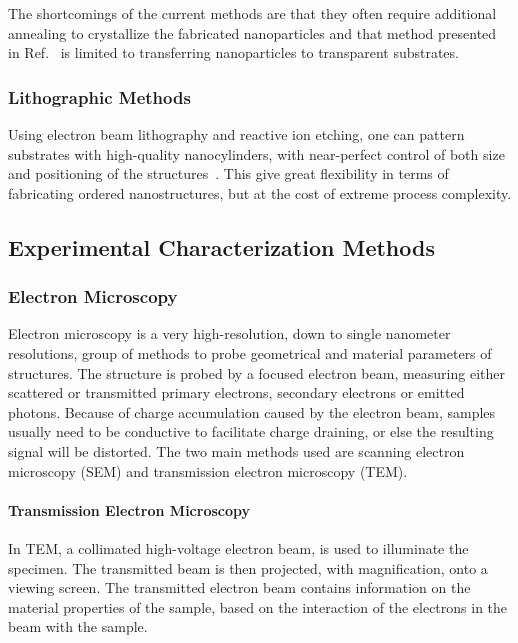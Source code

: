                 The shortcomings of the current methods are that they often require additional annealing to crystallize the fabricated nanoparticles and that
            method presented in Ref.~\cite{zywietz2014laser} is limited to transferring nanoparticles to transparent substrates.

        \subsubsection{Lithographic Methods}
                Using electron beam lithography and reactive ion etching, one can pattern substrates with high-quality nanocylinders, with near-perfect
            control of both size and positioning of the structures~\cite{bakker2015magnetic}. This give great flexibility in terms of fabricating ordered nanostructures, but at the
            cost of extreme process complexity.

    \subsection{Experimental Characterization Methods}
        \subsubsection{Electron Microscopy}
        \label{sec:ElectronMicroscopy}
                Electron microscopy is a very high-resolution, down to single nanometer resolutions, group of methods to probe geometrical and
            material parameters of structures. The structure is probed by a focused electron beam, measuring either scattered or transmitted
            primary electrons, secondary electrons or emitted photons. Because of charge accumulation caused by the electron beam, samples
            usually need to be conductive to facilitate charge draining, or else the resulting signal will be distorted.
                The two main methods used are scanning electron microscopy (SEM) and transmission electron microscopy (TEM).

            \paragraph{Transmission Electron Microscopy}
                    In TEM, a collimated high-voltage electron beam, is used to illuminate the specimen. The transmitted beam is then projected,
                with magnification, onto a viewing screen. The transmitted electron beam contains information on the material properties of the
                sample, based on the interaction of the electrons in the beam with the sample.

